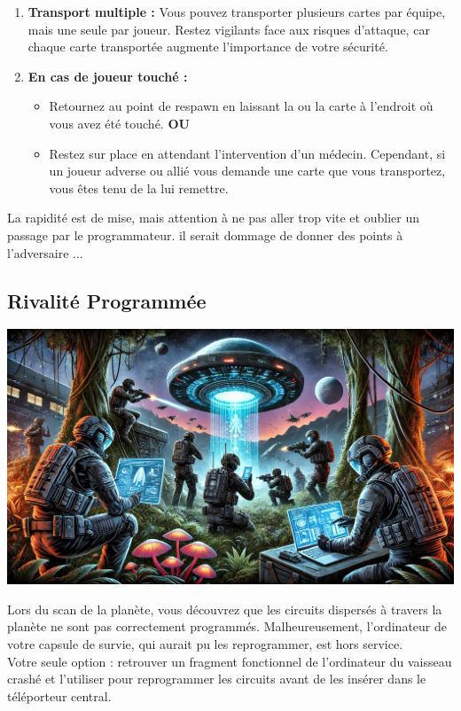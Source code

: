 \documentclass{template}
\begin{document}
\begin{enumerate}
    \item \textbf{Transport multiple :} Vous pouvez transporter plusieurs cartes par équipe, mais une seule par joueur. Restez vigilants face aux risques d’attaque, car chaque carte transportée augmente l’importance de votre sécurité.
    \item \textbf{En cas de joueur touché :}
    \begin{itemize}
        \item Retournez au point de respawn en laissant la ou la carte à l’endroit où vous avez été touché.\newline
        \textbf{OU}
        \item Restez sur place en attendant l’intervention d’un médecin. Cependant, si un joueur adverse ou allié vous demande une carte que vous transportez, vous êtes tenu de la lui remettre.
    \end{itemize}
\end{enumerate}

La rapidité est de mise, mais attention à ne pas aller trop vite et oublier un passage par le programmateur. il serait dommage de donner des points à l'adversaire ...

\subsection{Rivalité Programmée}  %

\begin{minipage}[t]{0.48\textwidth}
    \vspace{0em}
    \includegraphics[width=\linewidth]{docs/img/variante3.png}
\end{minipage}
\hfill
\begin{minipage}[t]{0.48\textwidth}
Lors du scan de la planète, vous découvrez que les circuits dispersés à travers la planète ne sont pas correctement programmés. Malheureusement, l'ordinateur de votre capsule de survie, qui aurait pu les reprogrammer, est hors service. \\

Votre seule option : retrouver un fragment fonctionnel de l’ordinateur du vaisseau crashé et l’utiliser pour reprogrammer les circuits avant de les insérer dans le téléporteur central. 
\end{minipage}
\end{document}
